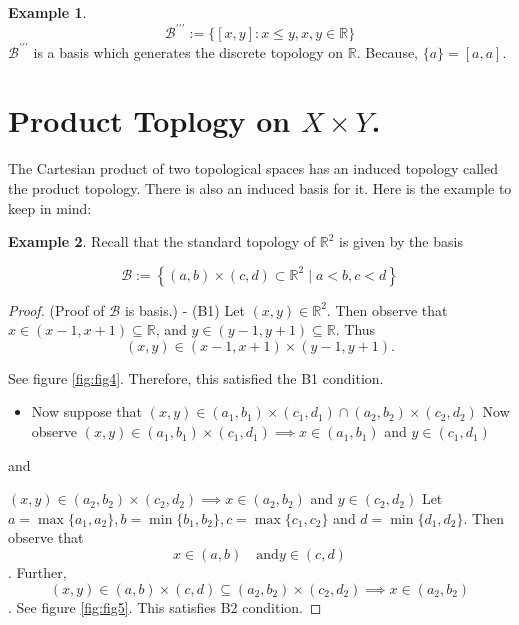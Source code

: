 \documentclass[
]{book}
\providecommand{\tightlist}{%
  \setlength{\itemsep}{0pt}\setlength{\parskip}{0pt}}
\theoremstyle{definition}
\theoremstyle{definition}
\newtheorem{example}{Example}[chapter]
\theoremstyle{definition}
\theoremstyle{definition}
\theoremstyle{remark}
\begin{document}
\begin{example}
\protect\hypertarget{exm:unnamed-chunk-32}{}\label{exm:unnamed-chunk-32}\[\mathcal{B}^{\prime\prime\prime}:=\{[x,y]:x\leq y, x,y\in \mathbb{R}\}\]
\(\mathcal{B}^{\prime\prime\prime}\) is a basis which generates the discrete topology on \(\mathbb{R}\). Because, \(\{a\}=[a,a]\).
\end{example}

\hypertarget{product-toplogy-on-x-times-y.}{%
\section{\texorpdfstring{Product Toplogy on \(X \times Y\).}{Product Toplogy on X \textbackslash times Y.}}\label{product-toplogy-on-x-times-y.}}

The Cartesian product of two topological spaces has an induced topology called the product topology. There is also an induced basis for it. Here is the example to keep in mind:

\begin{example}
\protect\hypertarget{exm:egR2}{}\label{exm:egR2}Recall that the standard topology of \(\mathbb{R}^{2}\) is given by the basis

\[
\mathcal{B}:=\left\{(a, b) \times(c, d) \subset \mathbb{R}^{2} \mid a<b, c<d\right\}
\]
\end{example}

\begin{proof}
(Proof of \(\mathcal{B}\) is basis.)
- (B1) Let \((x,y)\in \mathbb{R}^2\). Then observe that \(x\in(x-1,x+1)\subseteq \mathbb{R}\), and \(y\in(y-1,y+1)\subseteq \mathbb{R}\). Thus
\[(x,y)\in (x-1,x+1)\times (y-1,y+1).\]

See figure \ref{fig:fig4}.
Therefore, this satisfied the B1 condition.

\begin{itemize}
\tightlist
\item
  Now suppose that \((x,y)\in (a_1,b_1)\times(c_1,d_1)\cap (a_2,b_2)\times(c_2,d_2)\)
  Now observe
  \((x,y)\in (a_1,b_1)\times(c_1,d_1)\implies x\in(a_1,b_1)\) and \(y\in(c_1,d_1)\)
\end{itemize}

and

\((x,y)\in (a_2,b_2)\times(c_2,d_2)\implies x\in(a_2,b_2)\) and \(y\in(c_2,d_2)\)
Let \(a=\max\{a_1,a_2\},b=\min\{b_1,b_2\}, c=\max\{c_1,c_2\}\) and \(d=\min\{d_1,d_2\}\). Then observe that
\[x\in (a,b)\quad \text{and} y\in (c,d)\].
Further, \[(x,y)\in (a,b)\times (c,d)\subseteq (a_2,b_2)\times(c_2,d_2)\implies x\in(a_2,b_2)\].
See figure \ref{fig:fig5}.
This satisfies B2 condition.
\end{proof}
\end{document}
